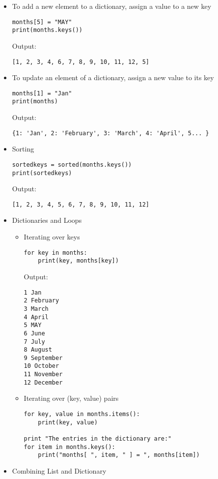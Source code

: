 \documentclass{article}
\begin{document}
\begin{itemize}
\item To add a new element to a dictionary, assign a value to a new key

	\begin{verbatim}
months[5] = "MAY"
print(months.keys())
	\end{verbatim}
Output:
	\begin{verbatim}
[1, 2, 3, 4, 6, 7, 8, 9, 10, 11, 12, 5]
	\end{verbatim}

\item To update an element of a dictionary, assign a new value to its key
	\begin{verbatim}
months[1] = "Jan"
print(months)
	\end{verbatim}
Output:
	\begin{verbatim}
{1: 'Jan', 2: 'February', 3: 'March', 4: 'April', 5... }
	\end{verbatim}

\item Sorting

	\begin{verbatim}
sortedkeys = sorted(months.keys())
print(sortedkeys)
	\end{verbatim}
Output:
	\begin{verbatim}
[1, 2, 3, 4, 5, 6, 7, 8, 9, 10, 11, 12]
	\end{verbatim}

\item Dictionaries and Loops
	\begin{itemize}
	\item Iterating over keys
	\begin{verbatim}
for key in months:
    print(key, months[key])
	\end{verbatim}
Output:
	\begin{verbatim}
1 Jan
2 February
3 March
4 April
5 MAY
6 June
7 July
8 August
9 September
10 October
11 November
12 December
	\end{verbatim}
	\item Iterating over (key, value) pairs
	\begin{verbatim}
for key, value in months.items():
    print(key, value)

print "The entries in the dictionary are:"
for item in months.keys():
    print("months[ ", item, " ] = ", months[item])
	\end{verbatim}
	\end{itemize}
\item Combining List and Dictionary


\end{itemize}
\end{document}
